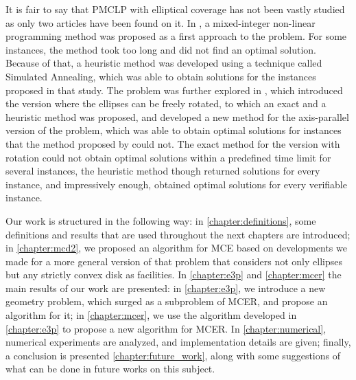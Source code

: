 It is fair to say that PMCLP with elliptical coverage has not been vastly studied as only two articles have been found on it. In , a mixed-integer non-linear programming method was proposed as a first approach to the problem. For some instances, the method took too long and did not find an optimal solution. Because of that, a heuristic method was developed using a technique called Simulated Annealing, which was able to obtain solutions for the instances proposed in that study.
The problem was further explored in , which introduced the version where the ellipses can be freely rotated, to which an exact and a heuristic method was proposed, and developed a new method for the axis-parallel version of the problem, which was able to obtain optimal solutions for instances that the method proposed by  could not.
The exact method for the version with rotation could not obtain optimal solutions within a predefined time limit for several instances, the heuristic method though returned solutions for every instance, and impressively enough, obtained optimal solutions for every verifiable instance.

Our work is structured in the following way: in \autoref{chapter:definitions}, some definitions and results that are used throughout the next chapters are introduced; in \autoref{chapter:mcd2}, we proposed an algorithm for MCE based on developments we made for a more general version of that problem that considers not only ellipses but any strictly convex disk as facilities.
In \autoref{chapter:e3p} and  \autoref{chapter:mcer} the main results of our work are presented: in \autoref{chapter:e3p}, we introduce a new geometry problem, which surged as a subproblem of MCER, and propose an algorithm for it;
in \autoref{chapter:mcer}, we use the algorithm developed in \autoref{chapter:e3p} to propose a new algorithm for MCER.
In \autoref{chapter:numerical}, numerical experiments are analyzed, and implementation details are given; finally, a conclusion is presented \autoref{chapter:future_work}, along with some suggestions of what can be done in future works on this subject.